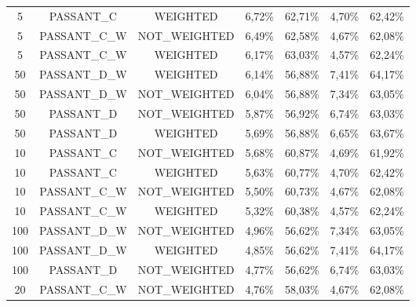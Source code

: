 \begin{table}[H]
{\begin{tabular}{ccccccc}
			5 &  PASSANT\_C &   WEIGHTED &     6,72\% &    62,71\% &     4,70\% &    62,42\% \\
			
			5 & PASSANT\_C\_W & NOT\_WEIGHTED &     6,49\% &    62,58\% &     4,67\% &    62,08\% \\
			
			5 & PASSANT\_C\_W &   WEIGHTED &     6,17\% &    63,03\% &     4,57\% &    62,24\% \\
			
			50 & PASSANT\_D\_W &   WEIGHTED &     6,14\% &    56,88\% &     7,41\% &    64,17\% \\
			
			50 & PASSANT\_D\_W & NOT\_WEIGHTED &     6,04\% &    56,88\% &     7,34\% &    63,05\% \\
			
			50 &  PASSANT\_D & NOT\_WEIGHTED &     5,87\% &    56,92\% &     6,74\% &    63,03\% \\
			
			50 &  PASSANT\_D &   WEIGHTED &     5,69\% &    56,88\% &     6,65\% &    63,67\% \\
			
			10 &  PASSANT\_C & NOT\_WEIGHTED &     5,68\% &    60,87\% &     4,69\% &    61,92\% \\
			
			10 &  PASSANT\_C &   WEIGHTED &     5,63\% &    60,77\% &     4,70\% &    62,42\% \\
			
			10 & PASSANT\_C\_W & NOT\_WEIGHTED &     5,50\% &    60,73\% &     4,67\% &    62,08\% \\
			
			10 & PASSANT\_C\_W &   WEIGHTED &     5,32\% &    60,38\% &     4,57\% &    62,24\% \\
			
			100 & PASSANT\_D\_W & NOT\_WEIGHTED &     4,96\% &    56,62\% &     7,34\% &    63,05\% \\
			
			100 & PASSANT\_D\_W &   WEIGHTED &     4,85\% &    56,62\% &     7,41\% &    64,17\% \\
			
			100 &  PASSANT\_D & NOT\_WEIGHTED &     4,77\% &    56,62\% &     6,74\% &    63,03\% \\
			
			20 & PASSANT\_C\_W & NOT\_WEIGHTED &     4,76\% &    58,03\% &     4,67\% &    62,08\% \\
			

\end{tabular}}
\end{table}
